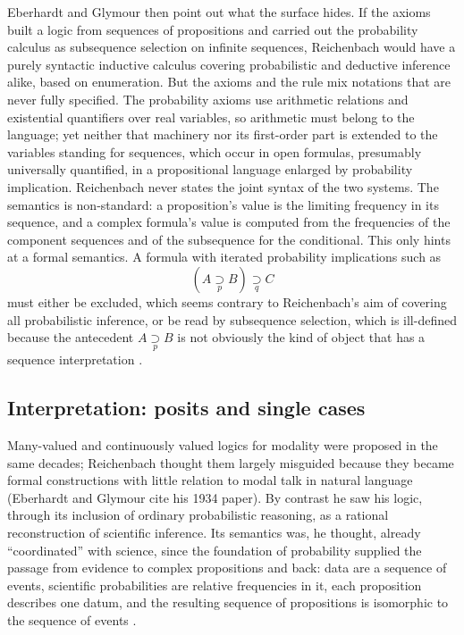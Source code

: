 Eberhardt and Glymour then point out what the surface hides. If the axioms built a
logic from sequences of propositions and carried out the probability
calculus as subsequence selection on infinite sequences, Reichenbach
would have a purely syntactic inductive calculus covering probabilistic
and deductive inference alike, based on enumeration. But the axioms and
the rule mix notations that are never fully specified. The probability
axioms use arithmetic relations and existential quantifiers over real
variables, so arithmetic must belong to the language; yet neither that
machinery nor its first-order part is extended to the variables standing
for sequences, which occur in open formulas, presumably universally
quantified, in a propositional language enlarged by probability
implication. Reichenbach never states the joint syntax of the two systems. The semantics is
non-standard: a proposition's value is the limiting frequency in its
sequence, and a complex formula's value is computed from the frequencies
of the component sequences and of the subsequence for the conditional.
This only hints at a formal semantics. A formula with iterated
probability implications such as
\[
 (A\mathrel{\underset{p}{\supset}}B)\mathrel{\underset{q}{\supset}}C
\]
must either be excluded, which seems contrary to Reichenbach's aim of
covering all probabilistic inference, or be read by subsequence
selection, which is ill-defined because the antecedent
\(A\mathrel{\underset{p}{\supset}}B\) is not obviously the kind of object
that has a sequence interpretation \cite[p.~372]{EberhardtGlymour2011ReichenbachReading}.

\subsection{Interpretation: posits and single cases}
\label{sec:p15-w02b-p15-030-eg-interpretation}

Many-valued and continuously valued logics for modality were proposed in
the same decades; Reichenbach thought them largely misguided because
they became formal constructions with little relation to modal talk in
natural language (Eberhardt and Glymour cite his 1934 paper). By contrast he saw
his logic, through its inclusion of ordinary probabilistic reasoning, as
a rational reconstruction of scientific inference. Its semantics was, he
thought, already ``coordinated'' with science, since the foundation of
probability supplied the passage from evidence to complex propositions
and back: data are a sequence of events, scientific probabilities are
relative frequencies in it, each proposition describes one datum, and
the resulting sequence of propositions is isomorphic to the sequence of
events \cite[pp.~372--373]{EberhardtGlymour2011ReichenbachReading}.

